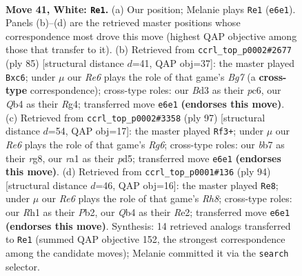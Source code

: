 \documentclass[11pt]{article}
\begin{document}
\clearpage

\begin{figure}[p]\centering
\begin{subfigure}{0.46\textwidth}\centering
\resizebox{\linewidth}{!}{%
\newchessgame
\chessboard[
  setfen={7r/1b3k2/4R3/8/1Q5p/3B3P/1p4P1/r5KR w - - 1 41},
  showmover=false,
  pgfstyle=straightmove, color=movearrow, markmove={e6-e1}
]}
\caption{}
\end{subfigure}\hfill
\begin{subfigure}{0.46\textwidth}\centering
\resizebox{\linewidth}{!}{%
\newchessgame
\chessboard[
  setfen={4r1k1/5pp1/2P5/6P1/2B3r1/8/3R1PbK/2R5 b - - 0 43},
  showmover=false,
  pgfstyle=straightmove, color=movearrow, markmove={g2-c6}
]}
\caption{}
\end{subfigure}
\\[4pt]
\begin{subfigure}{0.46\textwidth}\centering
\resizebox{\linewidth}{!}{%
\newchessgame
\chessboard[
  setfen={6R1/5K2/7k/3PB2p/p5p1/6r1/P3r3/8 b - - 1 49},
  showmover=false,
  pgfstyle=straightmove, color=movearrow, markmove={g3-f3}
]}
\caption{}
\end{subfigure}\hfill
\begin{subfigure}{0.46\textwidth}\centering
\resizebox{\linewidth}{!}{%
\newchessgame
\chessboard[
  setfen={7R/k2B4/3p4/p1r1b3/8/2P5/1PK1R3/5r2 w - - 2 48},
  showmover=false,
  pgfstyle=straightmove, color=movearrow, markmove={h8-e8}
]}
\caption{}
\end{subfigure}
\caption{\textbf{Move 41, White: \texttt{Re1}.} (a) Our position; Melanie plays \texttt{Re1} (\texttt{e6e1}). Panels (b)--(d) are the retrieved master positions whose correspondence most drove this move (highest QAP objective among those that transfer to it). (b) Retrieved from \texttt{ccrl\_top\_p0002\#2677} (ply 85) [structural distance $d$=41, QAP obj=37]: the master played \texttt{Bxc6}; under $\mu$ our \emph{Re6} plays the role of that game's \emph{Bg7} (a \textbf{cross-type} correspondence); cross-type roles: our \emph{B}d3 as their \emph{p}c6, our \emph{Q}b4 as their \emph{R}g4; transferred move \texttt{e6e1} \textbf{(endorses this move)}. (c) Retrieved from \texttt{ccrl\_top\_p0002\#3358} (ply 97) [structural distance $d$=54, QAP obj=17]: the master played \texttt{Rf3+}; under $\mu$ our \emph{Re6} plays the role of that game's \emph{Rg6}; cross-type roles: our \emph{b}b7 as their \emph{r}g8, our \emph{r}a1 as their \emph{p}d5; transferred move \texttt{e6e1} \textbf{(endorses this move)}. (d) Retrieved from \texttt{ccrl\_top\_p0001\#136} (ply 94) [structural distance $d$=46, QAP obj=16]: the master played \texttt{Re8}; under $\mu$ our \emph{Re6} plays the role of that game's \emph{Rh8}; cross-type roles: our \emph{R}h1 as their \emph{P}b2, our \emph{Q}b4 as their \emph{R}e2; transferred move \texttt{e6e1} \textbf{(endorses this move)}. Synthesis: 14 retrieved analogs transferred to \texttt{Re1} (summed QAP objective 152, the strongest correspondence among the candidate moves); Melanie committed it via the \texttt{search} selector.}
\label{fig:thought-m80}
\end{figure}
\end{document}
